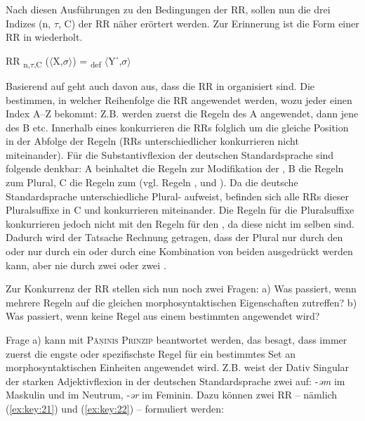  Nach diesen Ausführungen zu den Bedingungen der RR, sollen nun die drei Indizes (n, $\tau $, C) der RR näher erörtert werden. Zur Erinnerung ist die Form einer RR in  wiederholt.

\begin{exe}
  RR \textsubscript{n,$\tau $,C} ($\langle$X,$\sigma$$\rangle$) = \textsubscript{def} $\langle$Yˊ,$\sigma$$\rangle$
\end{exe}
 
Basierend auf \citet{Anderson1992} geht auch \citet{Stump2001} davon aus, dass die RR in  organisiert sind. Die  bestimmen, in welcher Reihenfolge die RR angewendet werden, wozu jeder  einen Index A–Z bekommt: Z.B. werden zuerst die Regeln des  A angewendet, dann jene des  B etc. Innerhalb eines  konkurrieren die RRs folglich um die gleiche Position in der Abfolge der Regeln (RRs unterschiedlicher  konkurrieren nicht miteinander). Für die Substantivflexion der deutschen Standardsprache sind folgende  denkbar:  A beinhaltet die Regeln zur Modifikation der ,  B die Regeln zum Plural,  C die Regeln zum  (vgl. Regeln ,  und ). Da die deutsche Standardsprache unterschiedliche Plural- aufweist, befinden sich alle RRs dieser Pluralsuffixe in  C und konkurrieren miteinander. Die Regeln für die Pluralsuffixe konkurrieren jedoch nicht mit den Regeln für den , da diese nicht im selben  sind. Dadurch wird der Tatsache Rechnung getragen, dass der Plural nur durch den  oder nur durch ein  oder durch eine Kombination von beiden ausgedrückt werden kann, aber nie durch zwei  oder zwei .

Zur Konkurrenz der RR stellen sich nun noch zwei Fragen: a) Was passiert, wenn mehrere Regeln auf die gleichen morphosyntaktischen Eigenschaften zutreffen? b) Was passiert, wenn keine Regel aus einem bestimmten  angewendet wird?

Frage a) kann mit \textsc{P\=aṇinis Prinzip} beantwortet werden, das besagt, dass immer zuerst die engste oder spezifischste Regel für ein bestimmtes Set an morphosyntaktischen Einheiten angewendet wird. Z.B. weist der Dativ Singular der starken Adjektivflexion in der deutschen Standardsprache zwei  auf: -\textit{əm} im Maskulin und im Neutrum, -\textit{ər} im Feminin. Dazu können zwei RR -- nämlich (\ref{ex:key:21}) und (\ref{ex:key:22}) -- formuliert werden:

